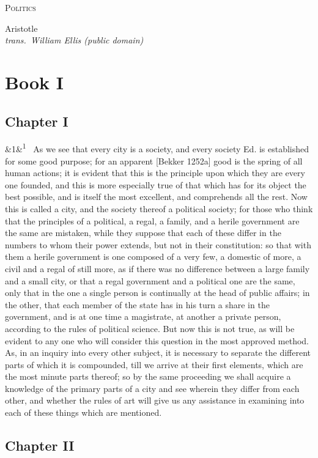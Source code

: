 \documentclass[12pt]{article}
\newcommand{\work}[1]{\begin{center}\LARGE\scshape #1\end{center}}
\newcommand{\attrib}[2]{\begin{center}\large #1\\[2pt]\small\itshape trans.\ #2\end{center}\vspace{1em}}
\newcommand{\para}[1][]{\par\noindent\ifx&#1&\else\textsuperscript{\footnotesize #1}~\fi}
\begin{document}
\work{Politics}

\attrib{Aristotle}{William Ellis (public domain)}

\section*{Book I}

\subsection*{Chapter I}

\para[1] As we see that every city is a society, and every society Ed. is established for some good purpose; for an apparent [Bekker 1252a] good is the spring of all human actions; it is evident that this is the principle upon which they are every one founded, and this is more especially true of that which has for its object the best possible, and is itself the most excellent, and comprehends all the rest. Now this is called a city, and the society thereof a political society; for those who think that the principles of a political, a regal, a family, and a herile government are the same are mistaken, while they suppose that each of these differ in the numbers to whom their power extends, but not in their constitution: so that with them a herile government is one composed of a very few, a domestic of more, a civil and a regal of still more, as if there was no difference between a large family and a small city, or that a regal government and a political one are the same, only that in the one a single person is continually at the head of public affairs; in the other, that each member of the state has in his turn a share in the government, and is at one time a magistrate, at another a private person, according to the rules of political science. But now this is not true, as will be evident to any one who will consider this question in the most approved method. As, in an inquiry into every other subject, it is necessary to separate the different parts of which it is compounded, till we arrive at their first elements, which are the most minute parts thereof; so by the same proceeding we shall acquire a knowledge of the primary parts of a city and see wherein they differ from each other, and whether the rules of art will give us any assistance in examining into each of these things which are mentioned.

\subsection*{Chapter II}
\end{document}
